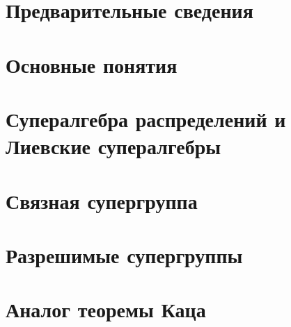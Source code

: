 \section{Предварительные сведения}
  

%
\newpage
\section{Основные понятия}
  

%
\newpage
\section{Супералгебра распределений и Лиевские супералгебры}
  

%
\newpage
\section{Связная супергруппа}
  

%
\newpage
\section{Разрешимые супергруппы}
  

%
\newpage
\section{Аналог теоремы Каца}
  